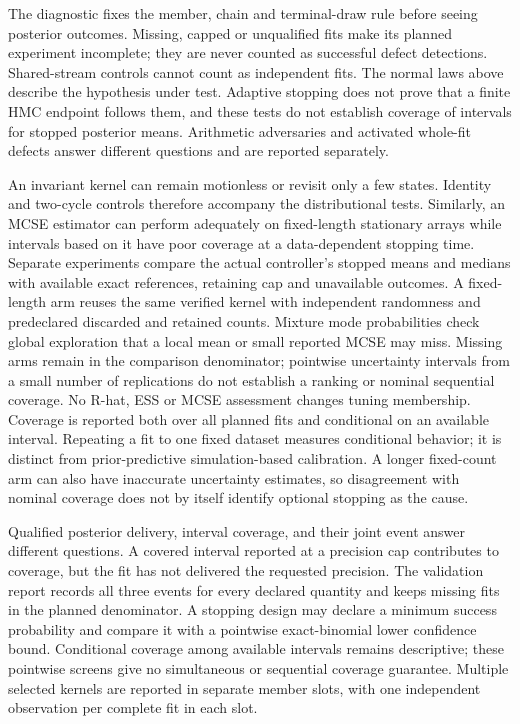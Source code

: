The diagnostic fixes the member, chain and terminal-draw rule before seeing
posterior outcomes. Missing, capped or unqualified fits make its planned
experiment incomplete; they are never counted as successful defect detections.
Shared-stream controls cannot count as independent fits. The normal laws above
describe the hypothesis under test. Adaptive stopping does not prove that a
finite HMC endpoint follows them, and these tests do not establish coverage of
intervals for stopped posterior means. Arithmetic adversaries and activated
whole-fit defects answer different questions and are reported separately.

An invariant kernel can remain motionless or revisit only a few states.
Identity and two-cycle controls therefore accompany the distributional tests.
Similarly, an MCSE estimator can perform adequately on fixed-length stationary
arrays while intervals based on it have poor coverage at a data-dependent
stopping time. Separate experiments compare the actual controller's stopped
means and medians with available exact references, retaining cap and unavailable
outcomes. A fixed-length arm reuses the same verified kernel with independent
randomness and predeclared discarded and retained counts. Mixture mode
probabilities check global exploration that a local mean or small reported MCSE
may miss. Missing arms remain in the comparison denominator; pointwise
uncertainty intervals from a small number of replications do not establish a
ranking or nominal sequential coverage. No R-hat, ESS or MCSE assessment changes
tuning membership.
Coverage is reported both over all planned fits and conditional on an available
interval. Repeating a fit to one fixed dataset measures conditional behavior;
it is distinct from prior-predictive simulation-based calibration. A longer
fixed-count arm can also have inaccurate uncertainty estimates, so disagreement
with nominal coverage does not by itself identify optional stopping as the cause.

Qualified posterior delivery, interval coverage, and their joint event answer
different questions. A covered interval reported at a precision cap contributes
to coverage, but the fit has not delivered the requested precision. The
validation report records all three events for every declared quantity and
keeps missing fits in the planned denominator. A stopping design may declare
a minimum success probability and compare it with a pointwise exact-binomial
lower confidence bound. Conditional coverage among available intervals remains
descriptive; these pointwise screens give no simultaneous or sequential
coverage guarantee. Multiple selected kernels are reported in separate member
slots, with one independent observation per complete fit in each slot.

